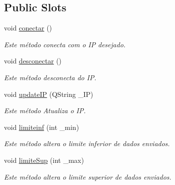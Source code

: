 \subsection*{Public Slots}
\begin{DoxyCompactItemize}
\item 
\mbox{\label{class_main_window_a62000ffa1534df6799cb64acc977e285}} 
void \mbox{\hyperlink{class_main_window_a62000ffa1534df6799cb64acc977e285}{conectar}} ()
\begin{DoxyCompactList}\small\item\em Este método conecta com o IP desejado. \end{DoxyCompactList}\item 
\mbox{\label{class_main_window_a44cae809331c23b6fdce421d11add74d}} 
void \mbox{\hyperlink{class_main_window_a44cae809331c23b6fdce421d11add74d}{desconectar}} ()
\begin{DoxyCompactList}\small\item\em Este método desconecta do IP. \end{DoxyCompactList}\item 
\mbox{\label{class_main_window_ade86323d89092da0a86d2673e2d1e980}} 
void \mbox{\hyperlink{class_main_window_ade86323d89092da0a86d2673e2d1e980}{update\+IP}} (Q\+String \+\_\+\+IP)
\begin{DoxyCompactList}\small\item\em Este método Atualiza o IP. \end{DoxyCompactList}\item 
\mbox{\label{class_main_window_a8068f1acc3bbe6cafffb3a66e53eb3ff}} 
void \mbox{\hyperlink{class_main_window_a8068f1acc3bbe6cafffb3a66e53eb3ff}{limiteinf}} (int \+\_\+min)
\begin{DoxyCompactList}\small\item\em Este método altera o limite inferior de dados enviados. \end{DoxyCompactList}\item 
\mbox{\label{class_main_window_add2e9d129fdbd6db065058839e679c60}} 
void \mbox{\hyperlink{class_main_window_add2e9d129fdbd6db065058839e679c60}{limite\+Sup}} (int \+\_\+max)
\begin{DoxyCompactList}\small\item\em Este método altera o limite superior de dados enviados. \end{DoxyCompactList}\item 

\end{DoxyCompactItemize}
